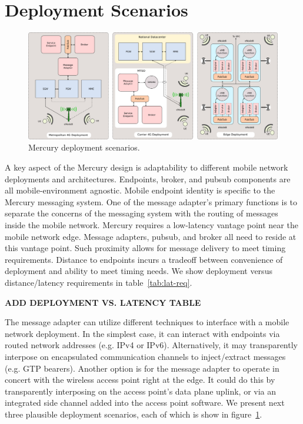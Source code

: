 \section{Deployment Scenarios}
\label{sec:deployments}

\begin{figure}[ht]
  \centering
  \includegraphics[width=\textwidth]{figs/deploy.png}
  \caption{Mercury deployment scenarios.}
  \label{fig:deployments}
\end{figure}

A key aspect of the Mercury design is adaptability to different mobile
network deployments and architectures. Endpoints, broker, and pubsub
components are all mobile-environment agnostic. Mobile endpoint
identity is specific to the Mercury messaging system. One of the message
adapter's primary functions is to separate the concerns of the
messaging system with the routing of messages inside the mobile
network.  Mercury requires a low-latency vantage point near the mobile
network edge. Message adapters, pubsub, and broker all need to reside
at this vantage point.  Such proximity allows for message delivery to
meet timing requirements.  Distance to endpoints incurs a tradeoff between
convenience of deployment and ability to meet timing needs. We show
deployment versus distance/latency requirements in
table~\ref{tab:lat-req}.

{\bf ADD DEPLOYMENT VS. LATENCY TABLE}

The message adapter can utilize different techniques to interface with
a mobile network deployment. In the simplest case, it can interact
with endpoints via routed network addresses (e.g. IPv4 or
IPv6). Alternatively, it may transparently interpose on encapsulated
communication channels to inject/extract messages (e.g. GTP
bearers). Another option is for the message adapter to operate in
concert with the wireless access point right at the edge. It could do
this by transparently interposing on the access point's data plane
uplink, or via an integrated side channel added into the access point
software.  We present next three plausible deployment scenarios, each
of which is show in figure~\ref{fig:deployments}.

